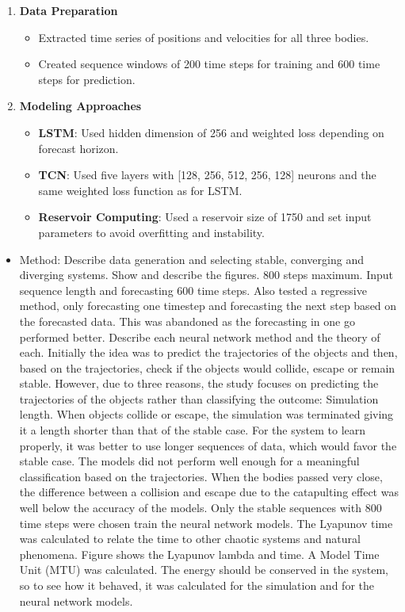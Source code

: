 \documentclass[%
 reprint,
 amsmath,amssymb,
 aps,
]{revtex4-2}
\begin{document}
\begin{enumerate}
    \item \textbf{Data Preparation}
        \begin{itemize}
            \item Extracted time series of positions and velocities for all three bodies.
            \item Created sequence windows of 200 time steps for training and 600 time steps for prediction.
        \end{itemize}
    
        \item \textbf{Modeling Approaches}
        \begin{itemize}
            \item \textbf{LSTM}: Used hidden dimension of 256 and weighted loss depending on forecast horizon.
            \item \textbf{TCN}: Used five layers with [128, 256, 512, 256, 128] neurons and the same weighted loss function as for LSTM.
            \item \textbf{Reservoir Computing}: Used a  reservoir size of 1750 and set input parameters to avoid overfitting and instability.
        \end{itemize}
\end{enumerate}

\begin{itemize}
    \item Method: Describe data generation and selecting stable, converging and diverging systems. Show and describe the figures. 800 steps maximum. Input sequence length and forecasting 600 time steps. Also tested a regressive method, only forecasting one timestep and forecasting the next step based on the forecasted data. This was abandoned as the forecasting in one go performed better. Describe each neural network method and the theory of each. Initially the idea was to predict the trajectories of the objects and then, based on the trajectories, check if the objects would collide, escape or remain stable. However, due to three reasons, the study focuses on predicting the trajectories of the objects rather than classifying the outcome: Simulation length. When objects collide or escape, the simulation was terminated giving it a length shorter than that of the stable case. For the system to learn properly, it was better to use longer sequences of data, which would favor the stable case. The models did not perform well enough for a meaningful classification based on the trajectories. When the bodies passed very close, the difference between a collision and escape due to the catapulting effect was well below the accuracy of the models. Only the stable sequences with 800 time steps were chosen train the neural network models. The Lyapunov time was calculated to relate the time to other chaotic systems and natural phenomena. Figure shows the Lyapunov lambda and time. A Model Time Unit (MTU) was calculated. The energy should be conserved in the system, so to see how it behaved, it was calculated for the simulation and for the neural network models.
\end{itemize}
\end{document}
